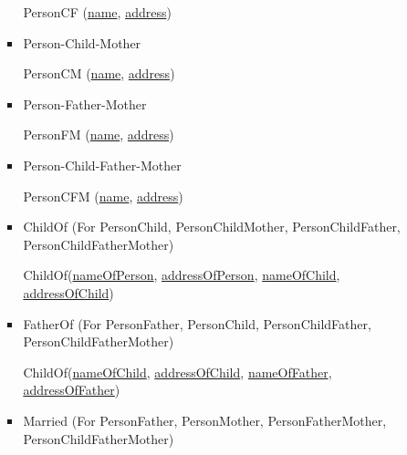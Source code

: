 \documentclass[12pt]{article}
\begin{document}
\begin{enumerate}[1.]
\begin{enumerate}[a)]
\begin{itemize}
            \quad PersonCF (\underline{name}, \underline{address})

            \bigskip

            \item Person-Child-Mother

            \bigskip

            \quad PersonCM (\underline{name}, \underline{address})

            \bigskip

            \item Person-Father-Mother

            \bigskip

            \quad PersonFM (\underline{name}, \underline{address})

            \bigskip

            \item Person-Child-Father-Mother

            \bigskip

            \quad PersonCFM (\underline{name}, \underline{address})

            \bigskip

            \item ChildOf (For PersonChild, PersonChildMother, PersonChildFather,\\ PersonChildFatherMother)

            \bigskip

            \quad ChildOf(\underline{nameOfPerson}, \underline{addressOfPerson},
                    \underline{nameOfChild}, \underline{addressOfChild})

            \bigskip

            \item FatherOf (For PersonFather, PersonChild, PersonChildFather, \\ PersonChildFatherMother)

            \bigskip

            \quad ChildOf(\underline{nameOfChild}, \underline{addressOfChild},
                    \underline{nameOfFather}, \underline{addressOfFather})

            \bigskip

            \item Married (For PersonFather, PersonMother, PersonFatherMother, \\ PersonChildFatherMother)

            \bigskip


\end{itemize}
\end{enumerate}
\end{enumerate}
\end{document}
